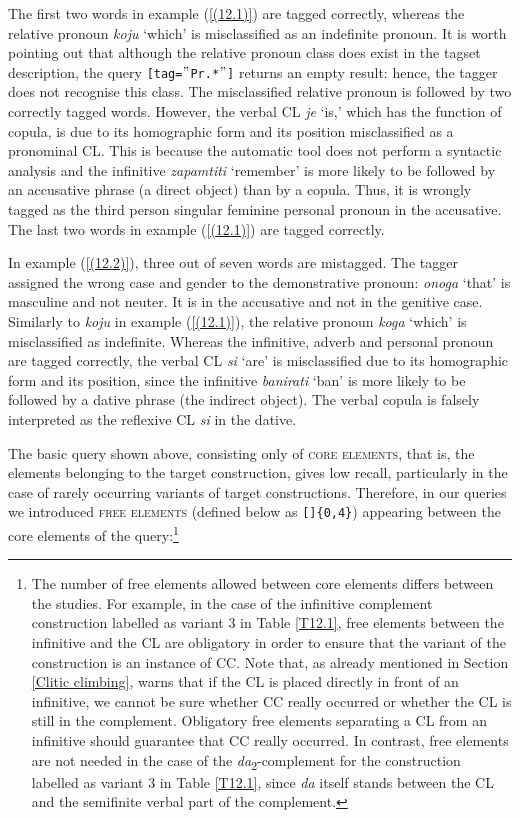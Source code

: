 \noindent The first two words in example (\ref{(12.1)}) are tagged correctly, whereas the relative pronoun \textit{koju} ‘which’ is misclassified as an indefinite pronoun. It is worth pointing out that although the relative pronoun class does exist in the tagset description, the query \texttt{[tag=$"$Pr.*$"$]} returns an empty result: hence, the tagger does not recognise this class. The misclassified relative pronoun is followed by two correctly tagged words. However, the verbal CL \textit{je} ‘is,’ which has the function of copula, is due to its homographic form and its position misclassified as a pronominal CL. This is because the automatic tool does not perform a syntactic analysis and the infinitive \textit{zapamtiti} ‘remember’ is more likely to be followed by an accusative phrase (a direct object) than by a copula. Thus, it is wrongly tagged as the third person singular feminine personal pronoun in the accusative. The last two words in example (\ref{(12.1)}) are tagged correctly.  

In example (\ref{(12.2)}), three out of seven words are mistagged. The tagger assigned the wrong case and gender to the demonstrative pronoun: \textit{onoga} ‘that’ is masculine and not neuter. It is in the accusative and not in the genitive case. Similarly to \textit{koju} in example (\ref{(12.1)}), the relative pronoun \textit{koga} ‘which’ is misclassified as indefinite. Whereas the infinitive, adverb and personal pronoun are tagged correctly, the verbal CL \textit{si} ‘are’ is misclassified due to its homographic form and its position, since the infinitive \textit{banirati} ‘ban’ is more likely to be followed by a dative phrase (the indirect object). The verbal copula is falsely interpreted as the reflexive CL \textit{si} in the dative. 

The basic query shown above, consisting only of \textsc{core} \textsc{elements}, that is, the elements belonging to the target construction, gives low recall, particularly in the case of rarely occurring variants of target constructions. Therefore, in our queries we introduced \textsc{free} \textsc{elements} (defined below as \texttt{[]\{0,4\}}) appearing between the core elements of the query:\footnote{The number of free elements allowed between core elements differs between the studies. For example, in the case of the infinitive complement construction labelled as variant 3 in Table \ref{T12.1}, free elements between the infinitive and the CL are obligatory in order to ensure that the variant of the construction is an instance of CC. Note that, as already mentioned in Section \ref{Clitic climbing}, \textcite[67]{Junghanns02} warns that if the CL is placed directly in front of an infinitive, we cannot be sure whether CC really occurred or whether the CL is still in the complement. Obligatory free elements separating a CL from an infinitive should guarantee that CC really occurred. In contrast, free elements are not needed in the case of the \textit{da}\textsubscript{2}-complement for the construction labelled as variant 3 in Table \ref{T12.1}, since \textit{da} itself stands between the CL and the semifinite verbal part of the complement.}



